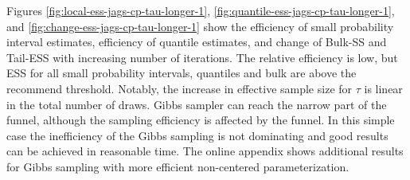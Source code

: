 \documentclass[american,]{article}
\theoremstyle{definition}
\begin{document}
Figures \ref{fig:local-ess-jags-cp-tau-longer-1},
\ref{fig:quantile-ess-jags-cp-tau-longer-1}, and
\ref{fig:change-ess-jags-cp-tau-longer-1} show the efficiency of small
probability interval estimates, efficiency of quantile estimates, and
change of Bulk-SS and Tail-ESS with increasing number of
iterations. The relative efficiency is low, but ESS for all small
probability intervals, quantiles and bulk are above the recommend
threshold. Notably, the increase in effective sample size for
$\tau$ is linear in the total number of draws.  Gibbs sampler can
reach the narrow part of the funnel, although the sampling efficiency
is affected by the funnel. In this simple case the inefficiency of the
Gibbs sampling is not dominating and good results can be achieved in
reasonable time. The online appendix shows additional results for Gibbs
sampling with more efficient non-centered parameterization.
\end{document}

